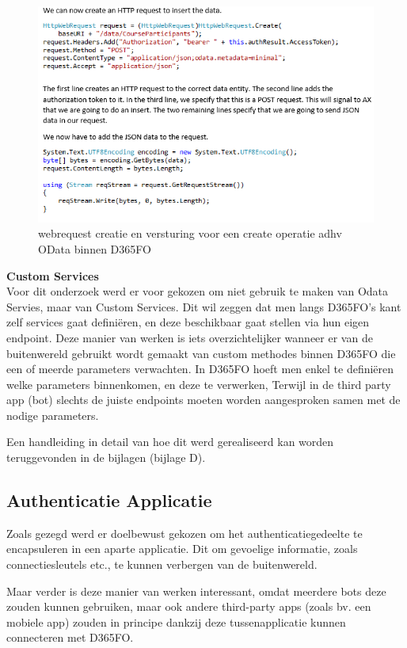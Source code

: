 \begin{figure}[H]
    \centering
    \includegraphics[width=1\textwidth]{img/ODataExample2}
\caption{webrequest creatie en versturing voor een create operatie adhv OData binnen D365FO \cite{Lanssens2018}}
\end{figure}

\textbf{Custom Services}\\
Voor dit onderzoek werd er voor gekozen om niet gebruik te maken van Odata Servies, maar van Custom Services. Dit wil zeggen dat men langs D365FO's kant zelf services gaat definiëren, en deze beschikbaar gaat stellen via hun eigen endpoint. Deze manier van werken is iets overzichtelijker wanneer er van de buitenwereld gebruikt wordt gemaakt van custom methodes binnen D365FO die een of meerde parameters verwachten. In D365FO hoeft men enkel te definiëren welke parameters binnenkomen, en deze te verwerken, Terwijl in de third party app (bot) slechts de juiste endpoints moeten worden aangesproken samen met de nodige parameters. 

Een handleiding in detail van hoe dit werd gerealiseerd kan worden teruggevonden in de bijlagen (bijlage D).


\subsection{Authenticatie Applicatie}
Zoals gezegd werd er doelbewust gekozen om het authenticatiegedeelte te encapsuleren in een aparte applicatie. Dit om gevoelige informatie, zoals connectiesleutels etc., te kunnen verbergen van de buitenwereld. 

Maar verder is deze manier van werken interessant, omdat meerdere bots deze zouden kunnen gebruiken, maar ook andere third-party apps (zoals bv. een mobiele app) zouden in principe dankzij deze tussenapplicatie kunnen connecteren met D365FO. 

